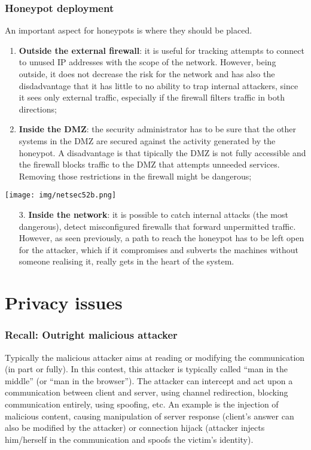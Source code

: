 \documentclass[a4paper, 10pt, titlepage]{article}
\begin{document}
\subsubsection*{Honeypot deployment}
An important aspect for honeypots is where they should be placed.\\
\begin{minipage}{0.45\textwidth}
	\begin{enumerate}
		\item \textbf{Outside the external firewall}: it is useful for tracking attempts to connect to unused IP addresses with the scope of the network. However, being outside, it does not decrease the risk for the network and has also the disdadvantage that it has little to no ability to trap internal attackers, since it sees only external traffic, especially if the firewall filters traffic in both directions;
		\item \textbf{Inside the DMZ}: the security administrator has to be sure that the other systems in the DMZ are secured against the activity generated by the honeypot. A disadvantage is that tipically the DMZ is not fully accessible and the firewall blocks traffic to the DMZ that attempts unneeded services. Removing those restrictions in the firewall might be dangerous;
 	\end{enumerate}
\end{minipage}\hfill
\begin{minipage}{0.52\textwidth}
	\begin{center}
		\texttt{[image: img/netsec52b.png]}
	\end{center}
\end{minipage}
\begin{enumerate}
	\item[3.] \textbf{Inside the network}: it is possible to catch internal attacks (the most dangerous), detect misconfigured firewalls that forward unpermitted traffic. However, as seen previously, a path to reach the honeypot has to be left open for the attacker, which if it compromises and subverts the machines without someone realising it, really gets in the heart of the system.
\end{enumerate}

\newpage
\section{Privacy issues}
\subsubsection*{Recall: Outright malicious attacker}
Typically the malicious attacker aims at reading or modifying the communication (in part or fully). In this contest, this attacker is typically called “man in the middle” (or “man in the browser”). The attacker can intercept and act upon a communication between client and server, using channel redirection, blocking communication entirely, using spoofing, etc. An example is the injection of malicious content, causing manipulation of server response (client’s answer can also be modified by the attacker) or connection hijack (attacker injects him/herself in the communication and spoofs the victim’s identity).
\end{document}
